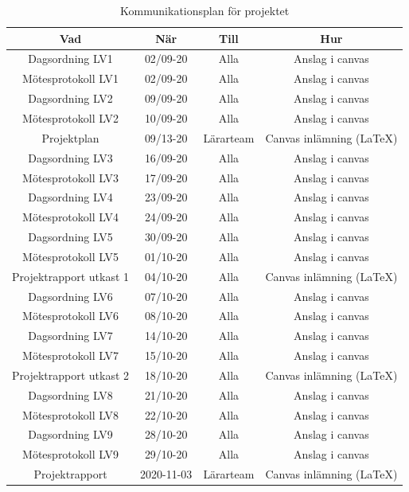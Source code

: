 \documentclass[a4paper]{article}
\begin{document}
\begin{table}[H]
    \centering
    \begin{tabular}{ |c|c|c|c| }\hline 
     Vad & När & Till & Hur \\\hline
     Dagsordning LV1 & 02/09-20 & Alla & Anslag i canvas \\\hline
     Mötesprotokoll LV1 & 02/09-20 & Alla & Anslag i canvas \\\hline
     Dagsordning LV2 & 09/09-20 & Alla & Anslag i canvas \\\hline
     Mötesprotokoll LV2 & 10/09-20 & Alla & Anslag i canvas \\\hline
     Projektplan & 09/13-20 & Lärarteam & Canvas inlämning (LaTeX) \\\hline 
     Dagsordning LV3 & 16/09-20 & Alla & Anslag i canvas \\\hline
     Mötesprotokoll LV3 & 17/09-20 & Alla & Anslag i canvas \\\hline
     Dagsordning LV4 & 23/09-20 & Alla & Anslag i canvas \\\hline
     Mötesprotokoll LV4 & 24/09-20 & Alla & Anslag i canvas \\\hline
     Dagsordning LV5 & 30/09-20 & Alla & Anslag i canvas \\\hline
     Mötesprotokoll LV5 & 01/10-20 & Alla & Anslag i canvas \\\hline
     Projektrapport utkast 1 & 04/10-20 & Alla & Canvas inlämning (LaTeX) \\\hline
     Dagsordning LV6 & 07/10-20 & Alla & Anslag i canvas \\\hline
     Mötesprotokoll LV6 & 08/10-20 & Alla & Anslag i canvas \\\hline
     Dagsordning LV7 & 14/10-20 & Alla & Anslag i canvas \\\hline
     Mötesprotokoll LV7 & 15/10-20 & Alla & Anslag i canvas \\\hline
     Projektrapport utkast 2 & 18/10-20 & Alla & Canvas inlämning (LaTeX) \\\hline
     Dagsordning LV8 & 21/10-20 & Alla & Anslag i canvas \\\hline
     Mötesprotokoll LV8 & 22/10-20 & Alla & Anslag i canvas \\\hline
     Dagsordning LV9 & 28/10-20 & Alla & Anslag i canvas \\\hline
     Mötesprotokoll LV9 & 29/10-20 & Alla & Anslag i canvas \\\hline
     Projektrapport & 2020-11-03 & Lärarteam & Canvas inlämning (LaTeX) \\\hline
    \end{tabular}
    \caption{Kommunikationsplan för projektet}
    \label{table:kommunikationsplan}
\end{table}
\end{document}
